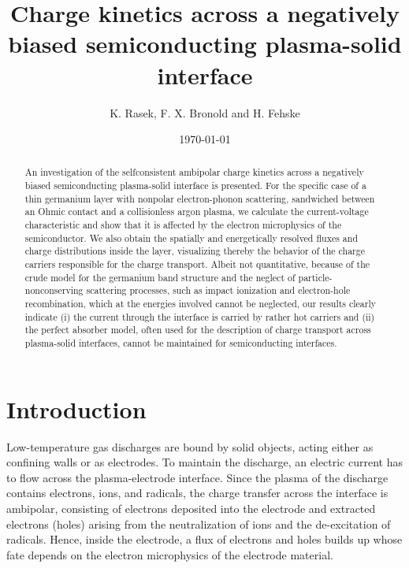 \documentclass[pre,reprint,floats]{revtex4-1}
\begin{document}
\title{Charge kinetics across a negatively biased semiconducting plasma-solid interface}


\author{K. Rasek, F. X. Bronold and H. Fehske}
\date{\today}


\begin{abstract}
An investigation of the selfconsistent ambipolar charge kinetics across a negatively
biased semiconducting plasma-solid interface is presented. For the specific 
case of a thin germanium layer with nonpolar electron-phonon scattering, sandwiched 
between an Ohmic contact and a collisionless argon plasma, we calculate the current-voltage 
characteristic and show that it is affected by the electron microphysics of the 
semiconductor. We also obtain the spatially and energetically resolved fluxes and charge 
distributions inside the layer, visualizing thereby the behavior of the charge carriers 
responsible for the charge transport. Albeit not quantitative, because of the crude model 
for the germanium band structure and the neglect of particle-nonconserving scattering 
processes, such as impact ionization and electron-hole recombination, which at the energies 
involved cannot be neglected, our results clearly indicate (i) the current through the 
interface is carried by rather hot carriers and (ii) the perfect absorber model, often used 
for the description of charge transport across plasma-solid interfaces, cannot be maintained 
for semiconducting interfaces. 
\end{abstract}

\maketitle

\section{Introduction}

Low-temperature gas discharges are bound by solid objects, acting either as confining walls 
or as electrodes. To maintain the discharge, an electric current has to flow across the 
plasma-electrode interface. Since the plasma of the discharge contains electrons, ions, and 
radicals, the charge transfer across the interface is ambipolar, consisting of electrons deposited 
into the electrode and extracted electrons (holes) arising from the neutralization of ions and the 
de-excitation of radicals. Hence, inside the electrode, a flux of electrons and holes builds up 
whose fate depends on the electron microphysics of the electrode material. 
\end{document}
